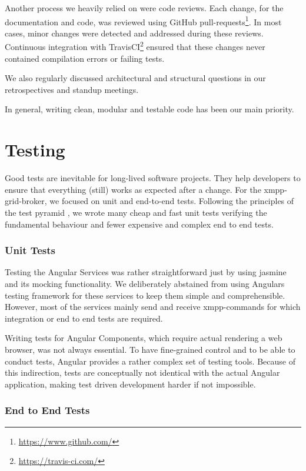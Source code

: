 Another process we heavily relied on were code reviews.
Each change, for the documentation and code, was reviewed using GitHub pull-requests\footnote{\url{https://www.github.com/}}.
In most cases, minor changes were detected and addressed during these reviews.
Continuous integration with TravisCI\footnote{\url{https://travis-ci.com/}} ensured that these changes never contained compilation errors or failing tests.

We also regularly discussed architectural and structural questions in our retrospectives and standup meetings.

In general, writing clean, modular and testable code has been our main priority.

\section{Testing}\label{sec:testing}

Good tests are inevitable for long-lived software projects.
They help developers to ensure that everything (still) works as expected after a change.
For the \gls{xmpp-grid-broker}, we focused on unit and end-to-end tests.
Following the principles of the test pyramid \cite{Cohn:2009:SAS:1667109}, we wrote many cheap and fast unit tests verifying the fundamental behaviour and fewer expensive and complex end to end tests.

\subsubsection{Unit Tests}

Testing the Angular Services was rather straightforward just by using jasmine and its mocking functionality.
We deliberately abstained from using Angulars testing framework for these services to keep them simple and comprehensible.
However, most of the services mainly send and receive \gls{xmpp}-commands for which integration or end to end tests are required.

Writing tests for Angular Components, which require actual rendering a web browser, was not always essential.
To have fine-grained control and to be able to conduct tests, Angular provides a rather complex set of testing tools.
Because of this indirection, tests are conceptually not identical with the actual Angular application, making test driven development harder if not impossible.

\subsubsection{End to End Tests}

